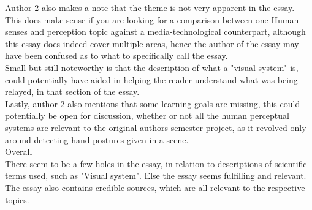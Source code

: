 \documentclass{article}
\begin{document}
Author 2 also makes a note that the theme is not very apparent in the essay. This does make sense if you are looking for a comparison between one Human senses and perception topic against a media-technological counterpart, although this essay does indeed cover multiple areas, hence the author of the essay may have been confused as to what to specifically call the essay.\\

Small but still noteworthy is that the description of what a "visual system" is, could potentially have aided in helping the reader understand what was being relayed, in that section of the essay.\\

Lastly, author 2 also mentions that some learning goals are missing, this could potentially be open for discussion, whether or not all the human perceptual systems are relevant to the original authors semester project, as it revolved only around detecting hand postures given in a scene.\\

\underline{Overall}\\
There seem to be a few holes in the essay, in relation to descriptions of scientific terms used, such as "Visual system". Else the essay seems fulfilling and relevant. The essay also contains credible sources, which are all relevant to the respective topics.
\end{document}
